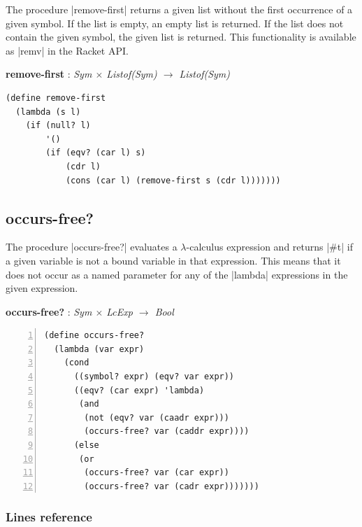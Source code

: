\documentclass[a4paper]{article}
\begin{document}
The procedure |remove-first| returns a given list without the first occurrence of a given symbol. If the list is empty, an empty list is returned. If the list does not contain the given symbol, the given list is returned. This functionality is available as |remv| in the Racket API.

\textbf{remove-first} : \textit{Sym $\times$ Listof(Sym) $\rightarrow$ Listof(Sym)}
\begin{lstlisting}[aboveskip=0pt]
(define remove-first
  (lambda (s l)
    (if (null? l)
        '()
        (if (eqv? (car l) s)
            (cdr l)
            (cons (car l) (remove-first s (cdr l)))))))
\end{lstlisting}

\subsection{occurs-free?}

The procedure |occurs-free?| evaluates a $\lambda$-calculus expression and returns |#t| if a given variable is not a bound variable in that expression. This means that it does not occur as a named parameter for any of the |lambda| expressions in the given expression.

\textbf{occurs-free?} : \textit{Sym $\times$ LcExp $\rightarrow$ Bool}
\begin{lstlisting}[aboveskip=0pt,numbers=left]
(define occurs-free?
  (lambda (var expr)
    (cond
      ((symbol? expr) (eqv? var expr))
      ((eqv? (car expr) 'lambda)
       (and
        (not (eqv? var (caadr expr)))
        (occurs-free? var (caddr expr))))
      (else
       (or
        (occurs-free? var (car expr))
        (occurs-free? var (cadr expr)))))))
\end{lstlisting}

\subsubsection*{Lines reference}
\end{document}
